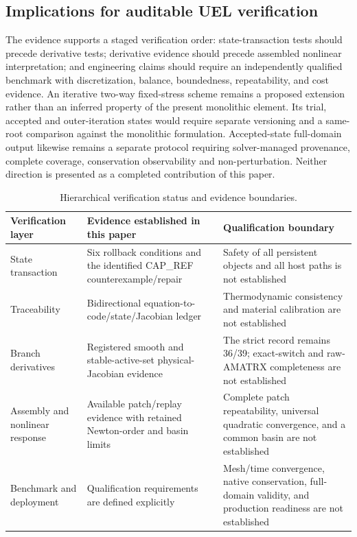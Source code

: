 \documentclass[preprint,12pt,authoryear]{elsarticle}
\begin{document}
\subsection{Implications for auditable UEL verification}

The evidence supports a staged verification order: state-transaction tests should precede derivative tests; derivative evidence should precede assembled nonlinear interpretation; and engineering claims should require an independently qualified benchmark with discretization, balance, boundedness, repeatability, and cost evidence. An iterative two-way fixed-stress scheme remains a proposed extension rather than an inferred property of the present monolithic element. Its trial, accepted and outer-iteration states would require separate versioning and a same-root comparison against the monolithic formulation. Accepted-state full-domain output likewise remains a separate protocol requiring solver-managed provenance, complete coverage, conservation observability and non-perturbation. Neither direction is presented as a completed contribution of this paper.


\begin{table}[!htbp]
\centering
\caption{Hierarchical verification status and evidence boundaries.}
\label{tab:4}
\small
\begin{tabularx}{\textwidth}{@{}>{\raggedright\arraybackslash}p{}*{2}{>{\raggedright\arraybackslash}X}@{}}
\toprule
Verification layer & Evidence established in this paper & Qualification boundary \\
\midrule
State transaction & Six rollback conditions and the identified CAP\_\allowbreak{}REF counterexample/repair & Safety of all persistent objects and all host paths is not established \\
Traceability & Bidirectional equation-to-code/state/Jacobian ledger & Thermodynamic consistency and material calibration are not established \\
Branch derivatives & Registered smooth and stable-active-set physical-Jacobian evidence & The strict record remains 36/39; exact-switch and raw-AMATRX completeness are not established \\
Assembly and nonlinear response & Available patch/replay evidence with retained Newton-order and basin limits & Complete patch repeatability, universal quadratic convergence, and a common basin are not established \\
Benchmark and deployment & Qualification requirements are defined explicitly & Mesh/time convergence, native conservation, full-domain validity, and production readiness are not established \\
\bottomrule
\end{tabularx}
\end{table}
\end{document}
